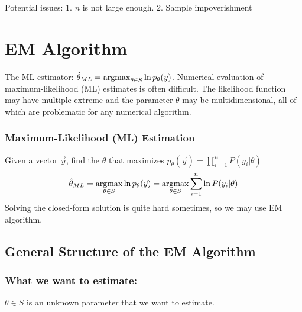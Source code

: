 \documentclass[11pt]{elegantbook}
\newcommand{\argmax}{\operatornamewithlimits{argmax}}
\begin{document}
Potential issues: 1. $n$ is not large enough. 2. Sample impoverishment





\chapter{EM Algorithm}

The ML estimator: $\hat{\theta}_{ML}=\argmax_{\theta\in S}\ln p_\theta(y)$. Numerical evaluation of maximum-likelihood (ML) estimates is often difficult. The likelihood function may have multiple extreme and the parameter $\theta$ may be multidimensional, all of which are problematic for any numerical algorithm.

\subsection*{Maximum-Likelihood (ML) Estimation}
Given a vector $\vec{y}$, find the $\theta$ that maximizes $p_\theta(\vec{y})=\prod_{i=1}^n P(y_i|\theta)$
$$\hat{\theta}_{ML}=\argmax_{\theta\in S}\ln p_\theta(\vec{y})=\argmax_{\theta\in S}\sum_{i=1}^n \ln P(y_i|\theta)$$
Solving the closed-form solution is quite hard sometimes, so we may use EM algorithm.

\section{General Structure of the EM Algorithm}

\subsection*{What we want to estimate:}
$\theta\in S$ is an unknown parameter that we want to estimate.
\end{document}
